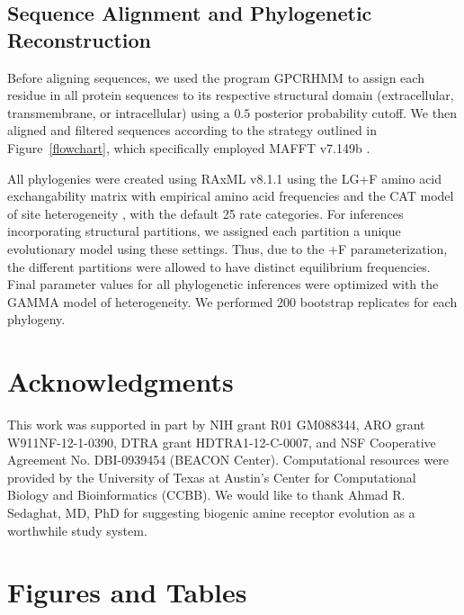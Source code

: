 \documentclass[fleqn,10pt]{wlpeerj}
\begin{document}
\subsection*{Sequence Alignment and Phylogenetic Reconstruction}
Before aligning sequences, we used the program GPCRHMM \citep{Wistrand2006} to assign each residue in all protein sequences to its respective structural domain (extracellular, transmembrane, or intracellular) using a $0.5$ posterior probability cutoff. We then aligned and filtered sequences according to the strategy outlined in Figure~\ref{flowchart}, which specifically employed MAFFT v7.149b \citep{mafftv7}. 

All phylogenies were created using RAxML v8.1.1 \citep{raxml} using the LG+F \citep{LG} amino acid exchangability matrix with empirical amino acid frequencies and the CAT model of site heterogeneity \citep{Stamatakis2006}, with the default 25 rate categories. For inferences incorporating structural partitions, we assigned each partition a unique evolutionary model using these settings. Thus, due to the +F parameterization, the different partitions were allowed to have distinct equilibrium frequencies. Final parameter values for all phylogenetic inferences were optimized with the GAMMA model of heterogeneity. We performed 200 bootstrap replicates for each phylogeny.



\section*{Acknowledgments}
This work was supported in part by NIH grant R01 GM088344, ARO grant W911NF-12-1-0390, DTRA grant HDTRA1-12-C-0007, and NSF Cooperative Agreement No. DBI-0939454 (BEACON Center).  Computational resources were provided by the University of Texas at Austin's Center for Computational Biology and Bioinformatics (CCBB). We would like to thank Ahmad R. Sedaghat, MD, PhD for suggesting biogenic amine receptor evolution as a worthwhile study system.





\newpage


\section*{Figures and Tables}


\vspace*{5cm}
\end{document}
